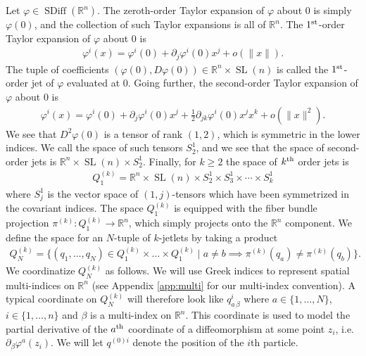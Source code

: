 \documentclass[12pt]{amsart}
\newcommand{\dm}[1]{\todo[inline,color=yellow!20]{DM:  #1}}
\newcommand{\R}{\ensuremath{\mathbb{R}}}
\DeclareMathOperator{\SDiff}{SDiff}
\DeclareMathOperator{\SL}{SL}
\begin{document}
  Let $\varphi \in \SDiff(\R^n)$.
  The zeroth-order Taylor expansion of $\varphi$ about $0$
  is simply $\varphi(0)$, and the collection of such Taylor
  expansions is all of $\R^n$.
  The $1^{\rm st}$-order Taylor expansion of $\varphi$ about $0$ is
  \begin{align*}
    \varphi^i( x) = \varphi^i(0) + \partial_j \varphi^i(0) x^j + o( \|x\|).
  \end{align*}
  The tuple of coefficients $(\varphi(0) , D\varphi(0) ) \in \R^n \times \SL(n)$ is
  called the $1^{\rm st}$-order jet of $\varphi$ evaluated at $0$.
  Going further, the second-order Taylor expansion of $\varphi$ about $0$
  is
  \begin{align*}
    \varphi^i(x) = \varphi^i(0) + \partial_j \varphi^i(0) x^j + 
    \frac{1}{2} \partial_{jk} \varphi^i(0) x^j x^k + o( \| x\|^2).
  \end{align*}
  We see that $D^2\varphi(0)$ is a tensor of rank $(1,2)$, which is
  symmetric in the lower indices.
  We call the space of such tensors $S^1_2$,
  and we see that the space of second-order jets is $\R^n \times \SL(n) \times S^1_2$.
  Finally, for $k \geq 2$ the space of $k^{\rm th}$ order jets is
  \begin{align*}
    Q_1^{(k)} = \R^n \times \SL(n) \times S^1_2 \times S^1_3 \times \cdots\times S^1_k
  \end{align*}
  where $S^1_j$ is the vector space of $(1,j)$-tensors which
  have been symmetrized in the covariant indices.
  The space $Q_1^{(k)}$ is equipped with the fiber bundle
  projection $\pi^{(k)} : Q_1^{(k)} \to \R^n$,
  which simply projects onto the $\R^n$ component.
  We define the space for an $N$-tuple of $k$-jetlets by taking a product
  \begin{align*}
    Q^{(k)}_N = \{ (q_1,\dots, q_N) \in Q_1^{(k)} \times \dots \times Q_1^{(k)}
    \mid a \neq b \implies \pi^{(k)}(q_a) \neq \pi^{(k)}(q_b) \}.
  \end{align*}
  We coordinatize $Q^{(k)}_N$ as follows.
  We will use Greek indices to represent spatial
  multi-indices on $\R^n$ (see Appendix \ref{app:multi} for our multi-index convention).
  A typical coordinate on $Q^{(k)}_N$ will therefore look
  like $q^i_{a\,\beta}$ where $a \in \{1,\dots,N\}$, $i \in \{ 1 , \dots, n \}$
  and $\beta$ is a multi-index on $\R^n$.
  This coordinate is used to model the partial derivative of the $a^{\rm th}$ coordinate
  of a diffeomorphism at some point $z_i$, \dm{Reminder: $z_i$ has to be clarified} i.e.\ $\partial_\beta \varphi^a(z_i)$.
  We will let $q^{(0)i}$ denote the position of the $i$th particle.
\end{document}
